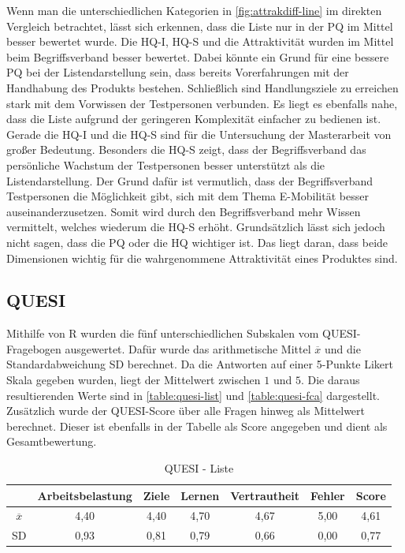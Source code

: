 Wenn man die unterschiedlichen Kategorien in \autoref{fig:attrakdiff-line} im direkten Vergleich betrachtet, lässt sich erkennen, dass die Liste nur in der \ac{PQ} im Mittel besser bewertet wurde.
Die \ac{HQ-I}, \ac{HQ-S} und die Attraktivität wurden im Mittel beim Begriffsverband besser bewertet.
Dabei könnte ein Grund für eine bessere \ac{PQ} bei der Listendarstellung sein, dass bereits Vorerfahrungen mit der Handhabung des Produkts bestehen.
Schließlich sind Handlungsziele zu erreichen stark mit dem Vorwissen der Testpersonen verbunden.
Es liegt es ebenfalls nahe, dass die Liste aufgrund der geringeren Komplexität einfacher zu bedienen ist.\\

Gerade die \ac{HQ-I} und die \ac{HQ-S} sind für die Untersuchung der Masterarbeit von großer Bedeutung.
Besonders die \ac{HQ-S} zeigt, dass der Begriffsverband das persönliche Wachstum der Testpersonen besser unterstützt als die Listendarstellung.
Der Grund dafür ist vermutlich, dass der Begriffsverband Testpersonen die Möglichkeit gibt, sich mit dem Thema E-Mobilität besser auseinanderzusetzen.
Somit wird durch den Begriffsverband mehr Wissen vermittelt, welches wiederum die \ac{HQ-S} erhöht.
Grundsätzlich lässt sich jedoch nicht sagen, dass die \ac{PQ} oder die \ac{HQ} wichtiger ist.
Das liegt daran, dass beide Dimensionen wichtig für die wahrgenommene Attraktivität eines Produktes sind.

\subsection{QUESI}
Mithilfe von R wurden die fünf unterschiedlichen Subskalen vom \ac{QUESI}-Fragebogen ausgewertet.
Dafür wurde das arithmetische Mittel $\overline{x}$ und die Standardabweichung SD berechnet.
Da die Antworten auf einer 5-Punkte Likert Skala gegeben wurden, liegt der Mittelwert zwischen $1$ und $5$.
Die daraus resultierenden Werte sind in \autoref{table:quesi-list} und \autoref{table:quesi-fca} dargestellt.
Zusätzlich wurde der \ac{QUESI}-Score über alle Fragen hinweg als Mittelwert berechnet.
Dieser ist ebenfalls in der Tabelle als Score angegeben und dient als Gesamtbewertung.

\begin{center}
    \begin{table}[!ht]
        \centering
        \begin{tabular}{|l|c|c|c|c|c|c|}
            \hline
                                                 & Arbeitsbelastung & Ziele & Lernen & Vertrautheit & Fehler & Score \\ \hline \hline
            \multicolumn{1}{|c|}{$\overline{x}$} & 4,40             & 4,40  & 4,70   & 4,67         & 5,00   & 4,61  \\ \hline
            \multicolumn{1}{|c|}{SD}             & 0,93             & 0,81  & 0,79   & 0,66         & 0,00   & 0,77  \\ \hline
        \end{tabular}
        \caption{QUESI - Liste}
        \label{table:quesi-list}
    \end{table}
\end{center}

